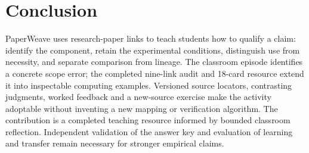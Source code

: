 \section{Conclusion}
PaperWeave uses research-paper links to teach students how to qualify a claim: identify the component, retain the experimental conditions, distinguish use from necessity, and separate comparison from lineage. The classroom episode identifies a concrete scope error; the completed nine-link audit and 18-card resource extend it into inspectable computing examples. Versioned source locators, contrasting judgments, worked feedback and a new-source exercise make the activity adoptable without inventing a new mapping or verification algorithm. The contribution is a completed teaching resource informed by bounded classroom reflection. Independent validation of the answer key and evaluation of learning and transfer remain necessary for stronger empirical claims.



